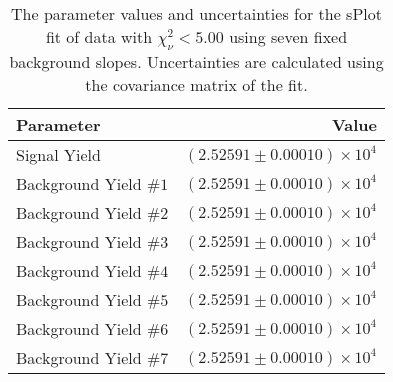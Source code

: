 
\begin{table}[h]
    \begin{center}
        \begin{tabular}{lr}\toprule
            Parameter & Value \\\midrule
            Signal Yield & $(2.52591 \pm 0.00010) \times 10^{4}$ \\
            Background Yield $\#1$ & $(2.52591 \pm 0.00010) \times 10^{4}$ \\
            Background Yield $\#2$ & $(2.52591 \pm 0.00010) \times 10^{4}$ \\
            Background Yield $\#3$ & $(2.52591 \pm 0.00010) \times 10^{4}$ \\
            Background Yield $\#4$ & $(2.52591 \pm 0.00010) \times 10^{4}$ \\
            Background Yield $\#5$ & $(2.52591 \pm 0.00010) \times 10^{4}$ \\
            Background Yield $\#6$ & $(2.52591 \pm 0.00010) \times 10^{4}$ \\
            Background Yield $\#7$ & $(2.52591 \pm 0.00010) \times 10^{4}$ \\\bottomrule
        \end{tabular}
        \caption{The parameter values and uncertainties for the sPlot fit of data with $\chi^2_\nu < 5.00$ using seven fixed background slopes. Uncertainties are calculated using the covariance matrix of the fit.}
    \end{center}
\end{table}
